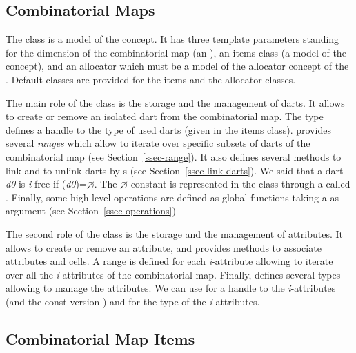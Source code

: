 \subsection{Combinatorial Maps}\label{ssec-combinatorial-map}

The class  is a model of the
 concept.  It has three template parameters
standing for the dimension of the combinatorial map (an 
), an items class (a model of the 
concept), and an allocator which must be a model of the allocator
concept of the {\stl}.  Default classes are provided for the items and
the allocator classes.

The main role of the class  is the storage and
the management of darts. It allows to create or remove an isolated
dart from the combinatorial map.  The  type defines a
handle to the type of used darts (given in the items class).
 provides several \emph{ranges} which allow to
iterate over specific subsets of darts of the combinatorial map (see
Section~\ref{ssec-range}).  It also defines several methods to link
and to unlink darts by \betai{}s (see
Section~\ref{ssec-link-darts}). We said that a dart \emph{d0} is \emph{i}-free 
if \betai{}(\emph{d0})=$\varnothing$.   The $\varnothing$ constant is
represented in the class  through a 
called \nulldart{}.  Finally, some high level
operations are defined as global functions taking a
 as argument (see
Section~\ref{ssec-operations})

The second role of the class  is the storage
and the management of attributes.  It allows to create or remove an
attribute, and provides methods to associate attributes and cells.
A range is defined for each \emph{i}-attribute allowing to iterate
over all the \emph{i}-attributes of the combinatorial map.  Finally,
 defines several types allowing to manage the
attributes. We can use
 for a handle to the
\emph{i}-attributes (and the const version
) and
 for the type of the
\emph{i}-attributes.

\subsection{Combinatorial Map Items}\label{ssec-item}

